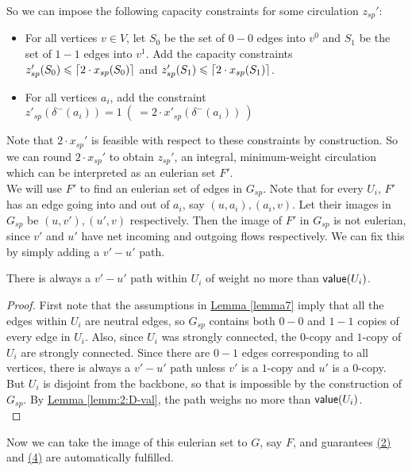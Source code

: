 \documentclass[./main.tex]{subfiles}
\DeclarePairedDelimiter\ceil{\lceil}{\rceil}
\begin{document}
		So we can impose the following capacity constraints for some circulation $z_{sp}'$:
		\begin{itemize}[-]
			\item For all vertices $v\in V$, let $S_0$ be the set of $0-0$ edges into $v^0$ and $S_1$ be the set of $1-1$ edges into $v^1$.
					Add the capacity constraints $z'_{sp}(S_0)\leqslant \ceil{2\cdot x_{sp}(S_0)}$ and $z'_{sp}(S_1)\leqslant \ceil{2\cdot x_{sp}(S_1)}$.

			\item For all vertices $a_i$, add the constraint $z'_{sp}(\delta^-(a_i)) = 1\  (\ = 2\cdot x'_{sp}(\delta^-(a_i))\ )$
		\end{itemize}
		Note that $2\cdot x_{sp}'$ is feasible with respect to these constraints by construction.
		So we can round $2\cdot x_{sp}'$ to obtain $z_{sp}'$, an integral, minimum-weight circulation which can be interpreted as an eulerian set $F'$.
		\vspace{2mm}\\
		We will use $F'$ to find an eulerian set of edges in $G_{sp}$. Note that for every $U_i$, $F'$ has an edge going into and out of $a_i$, say $(u,a_i),(a_i,v)$. Let their images in $G_{sp}$ be $(u,v'),(u',v)$ respectively. Then the image of $F'$ in $G_{sp}$ is not eulerian, since $v'$ and $u'$ have net incoming and outgoing flows respectively. We can fix this by simply adding a $v'-u'$ path.\vspace{2mm}
		\begin{claim}
			There is always a $v'-u'$ path within $U_i$ of weight no more than $\textsf{\textup{value}}(U_i)$.\label{claim:7:uvpath}
		\end{claim}
		\begin{proof}
			First note that the assumptions in \hyperref[lemma7]{Lemma \ref{lemma7}} imply that all the edges within $U_i$ are neutral edges, so $G_{sp}$ contains both $0-0$ and $1-1$ copies of every edge in $U_i$. Also, since $U_i$ was strongly connected, the $0$-copy and $1$-copy of $U_i$ are strongly connected. Since there are $0-1$ edges corresponding to all vertices, there is always a $v'-u'$ path unless $v'$ is a $1$-copy and $u'$ is a $0$-copy. But $U_i$ is disjoint from the backbone, so that is impossible by the construction of $G_{sp}$. By \hyperref[lemm:2:D-val]{Lemma \ref{lemm:2:D-val}}, the path weighs no more than $\textsf{\textup{value}}(U_i)$.\\
		\end{proof}
Now we can take the image of this eulerian set to $G$, say $F$, and guarantees \hyperref[lemm:main:2]{(2)} and \hyperref[lemm:main:4]{(4)} are automatically fulfilled.\vspace{2mm}
\end{document}
